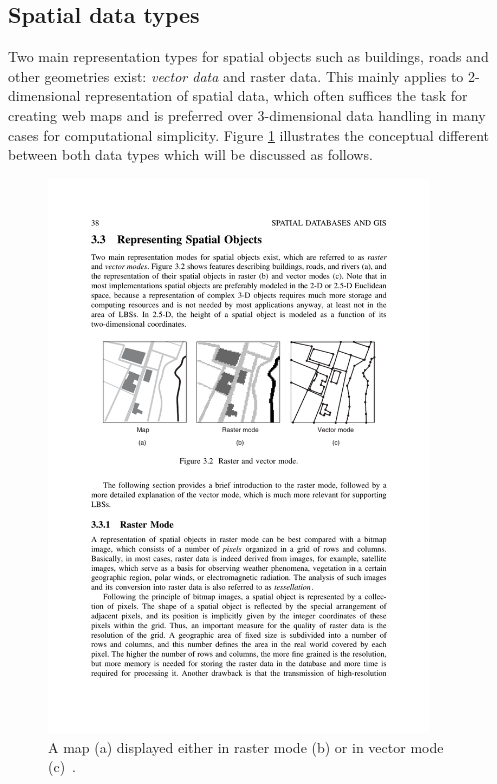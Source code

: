 \subsection{Spatial data types}

Two main representation types for spatial objects such as buildings, roads and other geometries exist: \textit{vector data} and {raster data}. This mainly applies to 2-dimensional representation of spatial data, which often suffices the task for creating web maps and is preferred over 3-dimensional data handling in many cases for computational simplicity. Figure \ref{fig:raster-vector} illustrates the conceptual different between both data types which will be discussed as follows.

\begin{figure}[h]
  \begin{center}
    \includegraphics[width=0.9\textwidth]{figures/raster_vs_vector.pdf}
    \caption{A map (a) displayed either in raster mode (b) or in vector mode (c)~\cite[page~38]{Kupper2005lbs}.}
    \label{fig:raster-vector}
  \end{center}
\end{figure}

